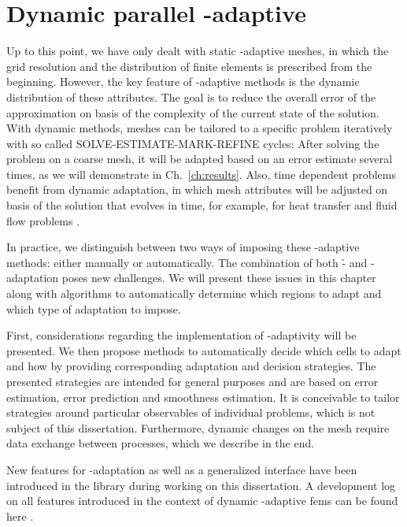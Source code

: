 \chapter{Dynamic parallel \hp-adaptive }
\label{ch:dynamic}
\glsresetall

Up to this point, we have only dealt with static \hp-adaptive meshes, in which the grid resolution and the distribution of finite elements is prescribed from the beginning. %
However, the key feature of \hp-adaptive methods is the dynamic distribution of these attributes. The goal is to reduce the overall error of the approximation on basis of the complexity of the current state of the solution. With dynamic methods, meshes can be tailored to a specific problem iteratively with so called SOLVE-ESTIMATE-MARK-REFINE cycles: After solving the problem on a coarse mesh, it will be adapted based on an error estimate several times, as we will demonstrate in Ch.~\ref{ch:results}. Also, time dependent problems benefit from dynamic adaptation, in which mesh attributes will be adjusted on basis of the solution that evolves in time, for example, for heat transfer \textcite{dealiistep-26} and fluid flow problems \textcite{dealiistep-31}.

In practice, we distinguish between two ways of imposing these \hp-adaptive methods: either manually or automatically. The combination of both \h- and \p-adaptation poses new challenges. We will present these issues in this chapter along with algorithms to automatically determine which regions to adapt and which type of adaptation to impose.

First, considerations regarding the implementation of \hp-adaptivity will be presented. We then propose methods to automatically decide which cells to adapt and how by providing corresponding adaptation and decision strategies. The presented strategies are intended for general purposes and are based on error estimation, error prediction and smoothness estimation. It is conceivable to tailor strategies around particular observables of individual problems, which is not subject of this dissertation. Furthermore, dynamic changes on the mesh require data exchange between processes, which we describe in the end.

New features for \hp-adaptation as well as a generalized interface have been introduced in the \dealii{} library \textcite{dealii920pre} during working on this dissertation. A development log on all features introduced in the context of dynamic \hp-adaptive \glspl{fem} can be found here \cite{dealiiissue7515}.





